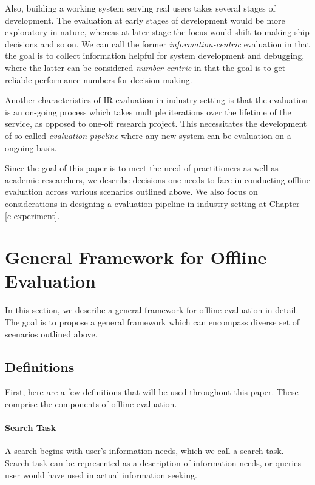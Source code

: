 \documentclass[openany]{now} %
\begin{document}
Also, building a working system serving real users takes several stages of development. The evaluation at early stages of development would be more exploratory in nature, whereas at later stage the focus would shift to making ship decisions and so on. We can call the former \textit{information-centric} evaluation in that the goal is to collect information helpful for system development and debugging, where the latter can be considered \textit{number-centric} in that the goal is to get reliable performance numbers for decision making.

Another characteristics of IR evaluation in industry setting is that the evaluation is an on-going process which takes multiple iterations over the lifetime of the service, as opposed to one-off research project. This necessitates the development of so called \textit{evaluation pipeline} where any new system can be evaluation on a ongoing basis.  

Since the goal of this paper is to meet the need of practitioners as well as academic researchers, we describe decisions one needs to face in conducting offline evaluation across various scenarios outlined above. We also focus on considerations in designing a evaluation pipeline in industry setting at Chapter \ref{c-experiment}.

\section{General Framework for Offline Evaluation}

In this section, we describe a general framework for offline evaluation in detail. The goal is to propose a general framework which can encompass diverse set of scenarios outlined above. 

\subsection{Definitions}

First, here are a few definitions that will be used throughout this paper. These comprise the components of offline evaluation.

\paragraph{Search Task} A search begins with user's information needs, which we call a search task. Search task can be represented as a description of information needs, or queries user would have used in actual information seeking.
\end{document}
